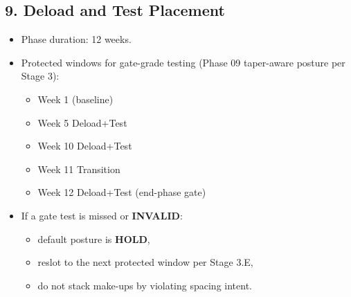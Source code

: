 \documentclass[10pt]{article}
\begin{document}
\begin{landscape}
\subsection*{9. Deload and Test Placement}


\begin{itemize}
\item Phase duration: 12 weeks.
\item Protected windows for gate-grade testing (Phase 09 taper-aware posture per Stage 3):
  \begin{itemize}
  \item Week 1 (baseline)
  \item Week 5 Deload+Test
  \item Week 10 Deload+Test
  \item Week 11 Transition
  \item Week 12 Deload+Test (end-phase gate)
  \end{itemize}
\item If a gate test is missed or \textbf{INVALID}:
  \begin{itemize}
  \item default posture is \textbf{HOLD},
  \item reslot to the next protected window per Stage 3.E,
  \item do not stack make-ups by violating spacing intent.
  \end{itemize}
\end{itemize}

\end{landscape}
\end{document}
